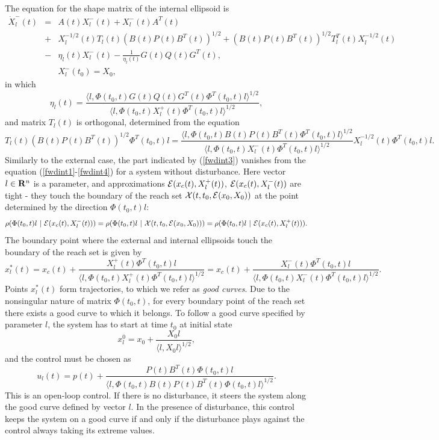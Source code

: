\documentclass{report}
\newcommand{\EE}{{\cal E}}
\newcommand{\XX}{{\cal X}}
\begin{document}
The equation for the shape matrix of the internal ellipsoid is
\begin{eqnarray}
\dot{X}^-_l(t) & = & A(t)X^-_l(t) + X^-_l(t)A^T(t) \label{fwdint1} \\
& + & X_l^{-1/2}(t)T_l(t)(B(t)P(t)B^T(t))^{1/2} +
(B(t)P(t)B^T(t))^{1/2}T_l^T(t)X_l^{-1/2}(t) \label{fwdint2} \\
& - & \eta_l(t)X^-_l(t) - \frac{1}{\eta_l(t)}G(t)Q(t)G^T(t), \label{fwdint3} \\
& & X^-_l(t_0) = X_0, \label{fwdint4}
\end{eqnarray}
in which
\[ \eta_l(t) = \frac{\langle l,
\Phi(t_0,t)G(t)Q(t)G^T(t)\Phi^T(t_0,t)l\rangle^{1/2}}{\langle l,
\Phi(t_0,t)X^+_l(t)\Phi^T(t_0,t)l\rangle^{1/2}}, \]
and matrix $T_l(t)$ is orthogonal, determined from the equation
\[ T_l(t)(B(t)P(t)B^T(t))^{1/2}\Phi^T(t_0,t)l = \frac{\langle l,
\Phi(t_0,t)B(t)P(t)B^T(t)\Phi^T(t_0,t)l\rangle^{1/2}}{\langle l,
\Phi(t_0,t)X_l^-(t)\Phi^T(t_0,t)l\rangle^{1/2}}X_l^{-1/2}(t)\Phi^T(t_0,t)l. \]
Similarly to the external case, the part indicated by (\ref{fwdint3}) vanishes from
the equation (\ref{fwdint1}-\ref{fwdint4}) for a system without disturbance.
Here vector $l\in{\bf R}^n$ is a parameter, and approximations
$\EE(x_c(t),X^+_l(t))$, $\EE(x_c(t),X^-_l(t))$ are tight - they touch
the boundary of the reach set $\XX(t,t_0,\EE(x_0,X_0))$ at the point
determined by the direction $\Phi(t_0,t)l$:
\begin{equation}
\rho(\Phi(t_0,t)l ~|~ \EE(x_c(t),X^-_l(t))) =
\rho(\Phi(t_0,t)l ~|~ \XX(t,t_0,\EE(x_0,X_0))) =
\rho(\Phi(t_0,t)l ~|~ \EE(x_c(t),X^+_l(t))). \label{fwdtight}
\end{equation}
The boundary point where the external and internal ellipsoids touch the
boundary of the reach set is given by
\[ x_l^*(t) = x_c(t) + \frac{X^+_l(t)\Phi^T(t_0,t)l}{\langle l,
\Phi(t_0,t)X^+_l(t)\Phi^T(t_0,t)l\rangle^{1/2}} =
x_c(t) + \frac{X^-_l(t)\Phi^T(t_0,t)l}{\langle l,
\Phi(t_0,t)X^-_l(t)\Phi^T(t_0,t)l\rangle^{1/2}}. \]
Points $x^*_l(t)$ form trajectories, to which we refer as {\it good
curves}.
Due to the nonsingular nature of matrix $\Phi(t_0,t)$,
for every boundary point of the reach set there exists a good curve
to which it belongs.
To follow a good curve specified by parameter $l$, the
system has to start at time $t_0$ at initial state
\begin{equation}
x^0_l = x_0 + \frac{X_0l}{\langle l,X_0l\rangle^{1/2}}, \label{x0lct}
\end{equation}
and the control must be chosen as
\begin{equation}
u_l(t) = p(t) + \frac{P(t)B^T(t)\Phi(t_0,t)l}{\langle l,
\Phi(t_0,t)B(t)P(t)B^T(t)\Phi(t_0,t)l\rangle^{1/2}}. \label{uct}
\end{equation}
This is an open-loop control.
If there is no disturbance, it steers the system along the good curve defined by
vector $l$.
In the presence of disturbance, this control keeps the system on a good curve
if and only if the disturbance plays against the control
always taking its extreme values.
\end{document}
